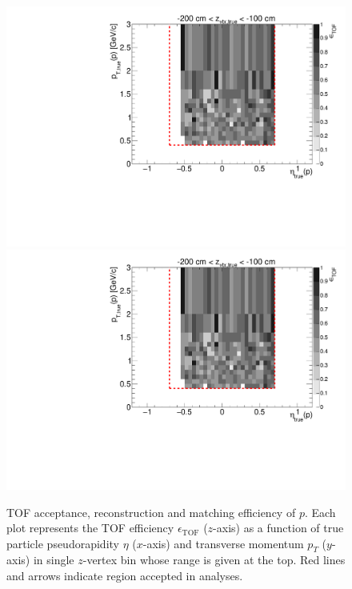 \begin{figure}[hb]
\caption[TOF acceptance, reconstruction and matching efficiency of $p$.]{TOF acceptance, reconstruction and matching efficiency of $p$. Each plot represents the TOF efficiency $\epsilon_{\text{TOF}}$ ($z$-axis) as a function of true particle pseudorapidity $\eta$ ($x$-axis) and transverse momentum $p_{T}$ ($y$-axis) in single $z$-vertex bin whose range is given at the top. Red lines and arrows indicate region accepted in analyses.}\label{fig:eff_proton_plus}
\centering
\parbox{0.495\textwidth}{
  \centering
  \includegraphics[width=\linewidth,page=3]{graphics/eff/Eff2D_TOF_proton_Plus.pdf}\\
  \includegraphics[width=\linewidth,page=5]{graphics/eff/Eff2D_TOF_proton_Plus.pdf}\\
}
\end{figure}
